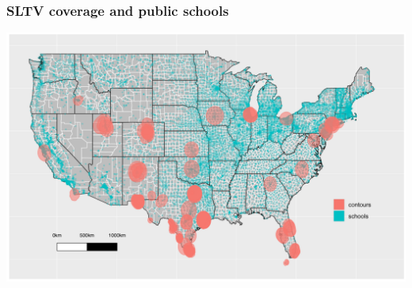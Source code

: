 \documentclass{beamer}
\begin{document}
\begin{frame}
\frametitle{SLTV coverage and public schools}
\centering
        \includegraphics[width=1\textwidth]{../../analysis/Output/img/Schools_pretty2.pdf}\\
\end{frame}


\end{document}
